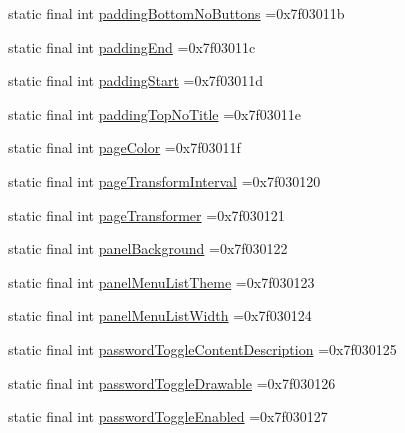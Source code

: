 \begin{DoxyCompactItemize}
\item 
static final int \mbox{\hyperlink{classcom_1_1example_1_1trainawearapplication_1_1_r_1_1attr_ad9b7c941d36f337f71d8ab32b84b07c6}{padding\+Bottom\+No\+Buttons}} =0x7f03011b
\item 
static final int \mbox{\hyperlink{classcom_1_1example_1_1trainawearapplication_1_1_r_1_1attr_a489d6d66db2bc9add2631811bda8f237}{padding\+End}} =0x7f03011c
\item 
static final int \mbox{\hyperlink{classcom_1_1example_1_1trainawearapplication_1_1_r_1_1attr_abca22fbbfcdd1f3a76098fbd249eb76e}{padding\+Start}} =0x7f03011d
\item 
static final int \mbox{\hyperlink{classcom_1_1example_1_1trainawearapplication_1_1_r_1_1attr_a4008793c239ca3f1be8b2612b03c291d}{padding\+Top\+No\+Title}} =0x7f03011e
\item 
static final int \mbox{\hyperlink{classcom_1_1example_1_1trainawearapplication_1_1_r_1_1attr_acae8d8a1bdb4890ba7020c43c5a1bb02}{page\+Color}} =0x7f03011f
\item 
static final int \mbox{\hyperlink{classcom_1_1example_1_1trainawearapplication_1_1_r_1_1attr_a87417a470d4f31d65b1631b95290f85a}{page\+Transform\+Interval}} =0x7f030120
\item 
static final int \mbox{\hyperlink{classcom_1_1example_1_1trainawearapplication_1_1_r_1_1attr_a301935b9eeb18e965ee5ec037a76aaf0}{page\+Transformer}} =0x7f030121
\item 
static final int \mbox{\hyperlink{classcom_1_1example_1_1trainawearapplication_1_1_r_1_1attr_aaae8a6bbc8b3121f61ad6ce030145277}{panel\+Background}} =0x7f030122
\item 
static final int \mbox{\hyperlink{classcom_1_1example_1_1trainawearapplication_1_1_r_1_1attr_a0f862ab76b3c7ab674b5c0e6169268fb}{panel\+Menu\+List\+Theme}} =0x7f030123
\item 
static final int \mbox{\hyperlink{classcom_1_1example_1_1trainawearapplication_1_1_r_1_1attr_a50e1e96a08953c09ec81510e75a05723}{panel\+Menu\+List\+Width}} =0x7f030124
\item 
static final int \mbox{\hyperlink{classcom_1_1example_1_1trainawearapplication_1_1_r_1_1attr_a5923a25b48bb17ee0244d9ffd0fd0d85}{password\+Toggle\+Content\+Description}} =0x7f030125
\item 
static final int \mbox{\hyperlink{classcom_1_1example_1_1trainawearapplication_1_1_r_1_1attr_afbb0722c6966ebc5fddb5e4b00d10d80}{password\+Toggle\+Drawable}} =0x7f030126
\item 
static final int \mbox{\hyperlink{classcom_1_1example_1_1trainawearapplication_1_1_r_1_1attr_ae696d0e29f8d20e72b292fca840957ac}{password\+Toggle\+Enabled}} =0x7f030127

\end{DoxyCompactItemize}
